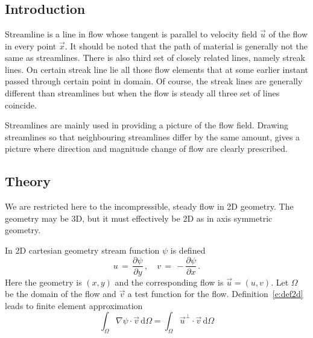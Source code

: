 \chapter{}
\noindent
{}

\section{Introduction}

Streamline is a line in flow whose tangent is parallel to velocity field
$\vec u$ of the flow in every point $\vec x$. It should be noted that the path of 
material is generally not the same as streamlines. There is also third set
of closely related lines, namely streak lines. On certain streak line
lie all those flow elements that at some earlier instant passed through
certain point in domain. Of course, the streak lines are generally different
than streamlines but when the flow is steady all three set of lines coincide.

Streamlines are mainly used in providing a picture of the flow field. 
Drawing streamlines so that neighbouring streamlines differ by the same amount, 
gives a picture where direction and magnitude change of flow are clearly prescribed.

\section{Theory}

We are restricted here to the incompressible, steady flow in 2D geometry.
The geometry may be 3D, but it must effectively be 2D as in axis symmetric
geometry.

In 2D cartesian geometry stream function $\psi$ is defined
\begin{equation}\label{e:def2d}
u \, = \, \frac{\partial \psi}{\partial y} \, , \quad
v \, = \, - \frac{\partial \psi}{\partial x} \,.
\end{equation}
Here the geometry is $(x,y)$ and the corresponding flow is $\vec u = (u,v)$.
Let $\Omega$ be the domain of the flow and $\vec v$ a test function for the flow.
Definition~\eqref{e:def2d} leads to finite element approximation
\begin{equation}\label{e:fem2D}
\int_\Omega \nabla \psi \cdot \vec v \, \text{d}\Omega
=
\int_\Omega \vec u^\perp \cdot \vec v \, \text{d}\Omega
\end{equation}

